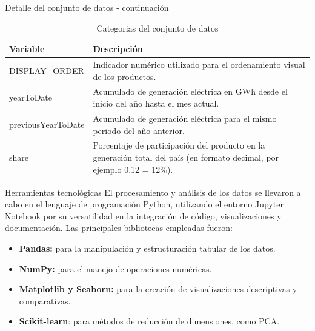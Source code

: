 \documentclass[10pt]{beamer}
\begin{document}
		\begin{frame}[fragile]{Detalle del conjunto de datos - continuaci\'on}
		\begin{table}[h!]
			\begin{tabular}{|l|p{7cm}|}
				\hline
				\textbf{Variable}  & \textbf{Descripción}                                                                                                    \\ \hline				
				DISPLAY\_ORDER     & Indicador numérico utilizado para el ordenamiento visual de los productos.                                              \\ \hline
				yearToDate         & Acumulado de generación eléctrica en GWh desde el inicio del año hasta el mes actual.                                   \\ \hline
				previousYearToDate & Acumulado de generación eléctrica para el mismo periodo del año anterior.                                               \\ \hline
				share              & Porcentaje de participación del producto en la generación total del país (en formato decimal, por ejemplo 0.12 = 12\%). \\ \hline
			\end{tabular}
			\caption{Categorias del conjunto de datos}\label{table:tab2}
		\end{table}	
	\end{frame}
	
	\begin{frame}[fragile]{Herramientas tecnol\'ogicas}
		El procesamiento y análisis de los datos se llevaron a cabo en el lenguaje de programación Python, utilizando el entorno Jupyter Notebook por su versatilidad en la integración de código, visualizaciones y documentación. Las principales bibliotecas empleadas fueron:
		
		\begin{itemize}
			\item \textbf{Pandas:} para la manipulación y estructuración tabular de los datos.
			\item \textbf{NumPy:} para el manejo de operaciones numéricas.	
			\item \textbf{Matplotlib y Seaborn:} para la creación de visualizaciones descriptivas y comparativas.		
			\item \textbf{Scikit-learn}: para métodos de reducción de dimensiones, como PCA.
		\end{itemize}
	\end{frame}
	
\end{document}
